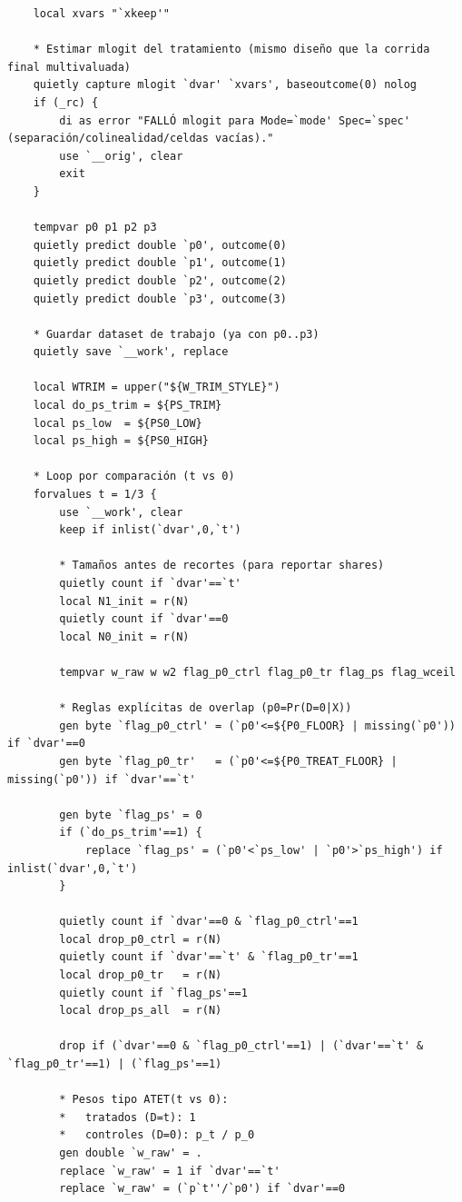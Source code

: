 \documentclass[12pt]{article}
\begin{document}
\begin{lstlisting}
    local xvars "`xkeep'"

    * Estimar mlogit del tratamiento (mismo diseño que la corrida final multivaluada)
    quietly capture mlogit `dvar' `xvars', baseoutcome(0) nolog
    if (_rc) {
        di as error "FALLÓ mlogit para Mode=`mode' Spec=`spec' (separación/colinealidad/celdas vacías)."
        use `__orig', clear
        exit
    }

    tempvar p0 p1 p2 p3
    quietly predict double `p0', outcome(0)
    quietly predict double `p1', outcome(1)
    quietly predict double `p2', outcome(2)
    quietly predict double `p3', outcome(3)

    * Guardar dataset de trabajo (ya con p0..p3)
    quietly save `__work', replace

    local WTRIM = upper("${W_TRIM_STYLE}")
    local do_ps_trim = ${PS_TRIM}
    local ps_low  = ${PS0_LOW}
    local ps_high = ${PS0_HIGH}

    * Loop por comparación (t vs 0)
    forvalues t = 1/3 {
        use `__work', clear
        keep if inlist(`dvar',0,`t')

        * Tamaños antes de recortes (para reportar shares)
        quietly count if `dvar'==`t'
        local N1_init = r(N)
        quietly count if `dvar'==0
        local N0_init = r(N)

        tempvar w_raw w w2 flag_p0_ctrl flag_p0_tr flag_ps flag_wceil

        * Reglas explícitas de overlap (p0=Pr(D=0|X))
        gen byte `flag_p0_ctrl' = (`p0'<=${P0_FLOOR} | missing(`p0')) if `dvar'==0
        gen byte `flag_p0_tr'   = (`p0'<=${P0_TREAT_FLOOR} | missing(`p0')) if `dvar'==`t'

        gen byte `flag_ps' = 0
        if (`do_ps_trim'==1) {
            replace `flag_ps' = (`p0'<`ps_low' | `p0'>`ps_high') if inlist(`dvar',0,`t')
        }

        quietly count if `dvar'==0 & `flag_p0_ctrl'==1
        local drop_p0_ctrl = r(N)
        quietly count if `dvar'==`t' & `flag_p0_tr'==1
        local drop_p0_tr   = r(N)
        quietly count if `flag_ps'==1
        local drop_ps_all  = r(N)

        drop if (`dvar'==0 & `flag_p0_ctrl'==1) | (`dvar'==`t' & `flag_p0_tr'==1) | (`flag_ps'==1)

        * Pesos tipo ATET(t vs 0):
        *   tratados (D=t): 1
        *   controles (D=0): p_t / p_0
        gen double `w_raw' = .
        replace `w_raw' = 1 if `dvar'==`t'
        replace `w_raw' = (`p`t''/`p0') if `dvar'==0


\end{lstlisting}
\end{document}
